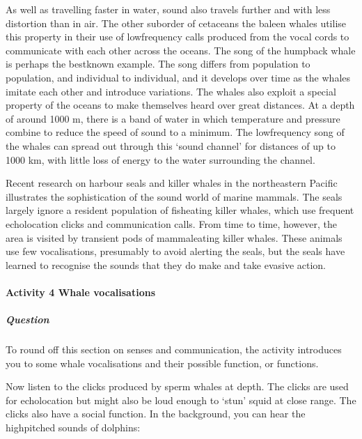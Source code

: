\documentclass[letterpaper,10pt,english]{sphinxmanual}
\begin{document}
As well as travelling faster in water, sound also travels further and with less distortion than in air. The other suborder of cetaceans \textendash{} the baleen whales \textendash{} utilise this property in their use of low\sphinxhyphen{}frequency calls produced from the vocal cords to communicate with each other across the oceans. The song of the humpback whale is perhaps the best\sphinxhyphen{}known example. The song differs from population to population, and individual to individual, and it develops over time as the whales imitate each other
and introduce variations. The whales also exploit a special property of the oceans to make themselves heard over great distances. At a depth of around 1000 m, there is a band of water in which temperature and pressure combine to reduce the speed of sound to a minimum. The low\sphinxhyphen{}frequency song of the whales can spread out through this ‘sound channel’ for distances of up to 1000 km, with little loss of energy to the water surrounding the channel.

Recent research on harbour seals and killer whales in the northeastern Pacific illustrates the sophistication of the sound world of marine mammals. The seals largely ignore a resident population of fish\sphinxhyphen{}eating killer whales, which use frequent echolocation clicks and communication calls. From time to time, however, the area is visited by transient pods of mammal\sphinxhyphen{}eating killer whales. These animals use few vocalisations, presumably to avoid alerting the seals, but the seals have learned to
recognise the sounds that they do make and take evasive action.


\paragraph{Activity 4 Whale vocalisations}
\label{\detokenize{content/session_00/Part_00_02:Activity-4-Whale-vocalisations}}


\subparagraph{Question}
\label{\detokenize{content/session_00/Part_00_02:id3}}
To round off this section on senses and communication, the activity introduces you to some whale vocalisations and their possible function, or functions.

Now listen to the clicks produced by sperm whales at depth. The clicks are used for echolocation but might also be loud enough to ‘stun’ squid at close range. The clicks also have a social function. In the background, you can hear the high\sphinxhyphen{}pitched sounds of dolphins:
\end{document}
